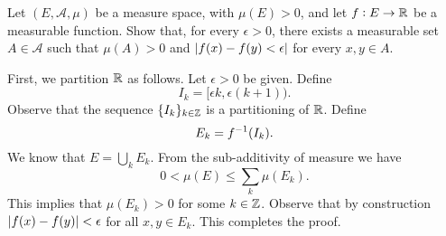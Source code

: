 \begin{problem}
	Let $ (E,\mathcal{A},\mu) $ be a measure space, with $ \mu(E) > 0 $, and let  $ f: E \to \mathbb{R} $ be a measurable function. Show that, for every $ \epsilon>0 $, there exists a measurable set $ A \in \mathcal{A} $ such that $ \mu(A) > 0 $ and $ |f(x) - f(y) < \epsilon| $ for every $ x,y \in A $.
\end{problem}
\begin{solution}
	First, we partition $ \mathbb{R} $ as follows. Let $ \epsilon>0 $ be given. Define
	\[ I_k = [\epsilon k, \epsilon(k+1)). \]
	Observe that the sequence $ \{I_k\}_{k\in \mathbb{Z}} $ is a partitioning of $ \mathbb{R} $. Define
	\[ E_k = f^{-1}(I_k). \]
	We know that $ E = \bigcup_k E_k $. From the sub-additivity of measure we have 
	\[ 0 < \mu(E) \leq \sum_k \mu(E_k). \]
	This implies that $ \mu(E_k) > 0 $ for some $ k \in \mathbb{Z} $. Observe that by construction $ |f(x) - f(y)| < \epsilon $ for all $ x,y \in E_k $. This completes the proof.
\end{solution}




